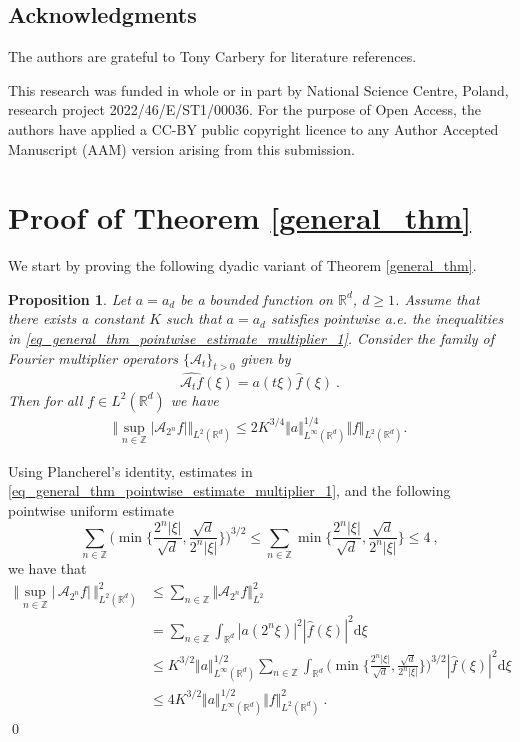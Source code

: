 \documentclass[a4paper, reqno]{amsart}
\newtheorem{proposition}[thm]{Proposition}
\theoremstyle{definition}
\newcommand{\R}{{\mathbb R}}
\newcommand{\dd}{{\mathrm d}}
\newcommand{\Fm}{\mathcal{A}}
\begin{document}
\subsection*{Acknowledgments}
The authors are grateful to Tony Carbery for literature references. 

This research was funded in whole or in part by National Science Centre, Poland, research project 2022/46/E/ST1/00036. For the purpose of Open Access, the authors have applied a
CC-BY public copyright licence to any Author Accepted Manuscript (AAM) version arising from this submission.

\section{Proof of Theorem \ref{general_thm}}

\label{sec: general_thm}
We start by proving the following dyadic variant of Theorem \ref{general_thm}. 
\begin{proposition}\label{general_thm_dyadic}
    Let  $a=a_d$ be a bounded function on $\mathbb{R}^d$, $d\geq 1$. Assume that there exists a constant $K$ such that $a=a_d$ satisfies pointwise a.e. the inequalities in \eqref{eq_general_thm_pointwise_estimate_multiplier_1}.
    Consider the family of Fourier multiplier operators $\lbrace \Fm_t\rbrace_{t>0}$ given by
    $$\widehat{\Fm_t f}(\xi)=a(t\xi)\widehat{f}(\xi)~.$$
    Then for all $f\in L^2(\R^d)$ we have
    \begin{align*}
        \Vert \sup_{n\in\mathbb{Z}} |\Fm_{2^n}f| \Vert_{L^2(\mathbb{R}^d)} \leq 2K^{3/4} \Vert a \Vert_{L^\infty(\mathbb{R}^d)}^{1/4}\Vert f \Vert_{L^2(\mathbb{R}^d)}.
    \end{align*}
\end{proposition}

\proof Using Plancherel's identity, estimates in  \eqref{eq_general_thm_pointwise_estimate_multiplier_1}, and the following pointwise uniform estimate
$$\sum_{n\in\mathbb{Z}}\bigg(\min \bigg\lbrace \frac{2^n|\xi|}{\sqrt{d}}, \frac{\sqrt{d}}{2^n|\xi|}\bigg\rbrace\bigg)^{3/2}\le \sum_{n\in\mathbb{Z}}\min \bigg\lbrace \frac{2^n|\xi|}{\sqrt{d}}, \frac{\sqrt{d}}{2^n|\xi|}\bigg\rbrace  \leq 4~,$$
we have that
\begin{equation*}\begin{split}
    \bigg\Vert \sup_{n\in\mathbb{Z}} |\, \Fm_{2^n}f|\, \bigg\Vert_{L^2(\mathbb{R}^d)}^2 & \leq \sum_{n\in\mathbb{Z}} \Vert \Fm_{2^n}f\Vert_{L^2}^2 \\
    & = \sum_{n\in\mathbb{Z}} \int_{\mathbb{R}^d} |a(2^n\xi)|^2|\widehat{f}(\xi)|^2 \dd\xi \\
    & \leq  K^{3/2} \Vert a \Vert_{L^\infty(\mathbb{R}^d)}^{1/2} \sum_{n\in\mathbb{Z}} \int_{\mathbb{R}^d} \bigg(\min \bigg\lbrace \frac{2^n|\xi|}{\sqrt{d}}, \frac{\sqrt{d}}{2^n|\xi|}\bigg\rbrace\bigg)^{3/2}|\widehat{f}(\xi)|^2 \dd\xi \\
    & \leq 4 K^{3/2} \Vert a \Vert_{L^\infty(\mathbb{R}^d)}^{1/2} \Vert f \Vert_{L^2(\mathbb{R}^d)}^2~.
    \end{split}
\end{equation*}
\qed
\end{document}
